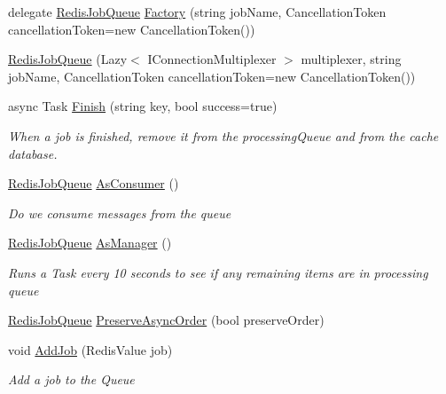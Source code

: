 \begin{DoxyCompactItemize}
\item 
delegate \hyperlink{class_demgel_redis_1_1_job_queue_1_1_redis_job_queue}{Redis\+Job\+Queue} \hyperlink{class_demgel_redis_1_1_job_queue_1_1_redis_job_queue_a30612ea8f10363f5fcfcdf4fb4ba07c2}{Factory} (string job\+Name, Cancellation\+Token cancellation\+Token=new Cancellation\+Token())
\item 
\hyperlink{class_demgel_redis_1_1_job_queue_1_1_redis_job_queue_a9d971219276f17816d0cbccacd360695}{Redis\+Job\+Queue} (Lazy$<$ I\+Connection\+Multiplexer $>$ multiplexer, string job\+Name, Cancellation\+Token cancellation\+Token=new Cancellation\+Token())
\item 
async Task \hyperlink{class_demgel_redis_1_1_job_queue_1_1_redis_job_queue_a99a97b83e2e8e2e26b8bc8b279b5270a}{Finish} (string key, bool success=true)
\begin{DoxyCompactList}\small\item\em When a job is finished, remove it from the processing\+Queue and from the cache database. \end{DoxyCompactList}\item 
\hyperlink{class_demgel_redis_1_1_job_queue_1_1_redis_job_queue}{Redis\+Job\+Queue} \hyperlink{class_demgel_redis_1_1_job_queue_1_1_redis_job_queue_aa73224944c4d505cd334dd970d930cea}{As\+Consumer} ()
\begin{DoxyCompactList}\small\item\em Do we consume messages from the queue \end{DoxyCompactList}\item 
\hyperlink{class_demgel_redis_1_1_job_queue_1_1_redis_job_queue}{Redis\+Job\+Queue} \hyperlink{class_demgel_redis_1_1_job_queue_1_1_redis_job_queue_a02f73c9f0eca4b31b26411cc21420ef0}{As\+Manager} ()
\begin{DoxyCompactList}\small\item\em Runs a Task every 10 seconds to see if any remaining items are in processing queue \end{DoxyCompactList}\item 
\hyperlink{class_demgel_redis_1_1_job_queue_1_1_redis_job_queue}{Redis\+Job\+Queue} \hyperlink{class_demgel_redis_1_1_job_queue_1_1_redis_job_queue_a90544b3949cb429cc8ef808dfabb0656}{Preserve\+Async\+Order} (bool preserve\+Order)
\item 
void \hyperlink{class_demgel_redis_1_1_job_queue_1_1_redis_job_queue_a4e442e47f67b5f6ff018db612e96fdae}{Add\+Job} (Redis\+Value job)
\begin{DoxyCompactList}\small\item\em Add a job to the Queue \end{DoxyCompactList}\item 

\end{DoxyCompactItemize}
